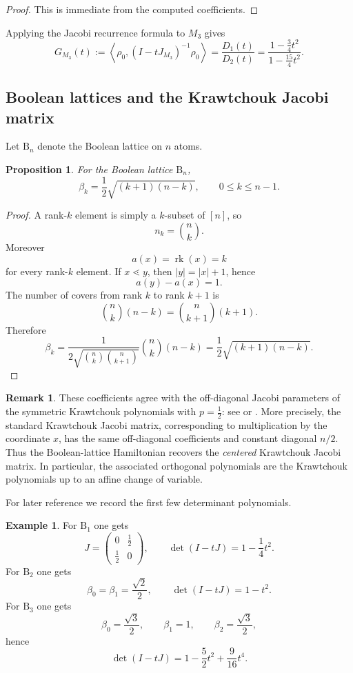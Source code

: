 \documentclass[11pt]{amsart}
\newtheorem{prop}[thm]{Proposition}
\theoremstyle{definition}
\newtheorem{remark}[thm]{Remark}
\newtheorem{example}[thm]{Example}
\DeclareMathOperator{\rk}{rk}
\newcommand{\ip}[2]{\left\langle #1, #2 \right\rangle}
\newcommand{\BB}{\mathrm{B}}
\begin{document}
\begin{proof}
This is immediate from the computed coefficients.
\end{proof}


Applying the Jacobi recurrence formula to $M_3$ gives
\[
G_{M_3}(t):=\ip{\rho_0}{(I-tJ_{M_3})^{-1}\rho_0}
=\frac{D_1(t)}{D_2(t)}
=
\frac{1-\frac34 t^2}{1-\frac{15}{4}t^2}.
\]



\subsection{Boolean lattices and the Krawtchouk Jacobi matrix}

Let $\BB_n$ denote the Boolean lattice on $n$ atoms.

\begin{prop}\label{prop:boolean-beta}
For the Boolean lattice $\BB_n$,
\[
\beta_k=\frac12 \sqrt{(k+1)(n-k)},
\qquad 0\le k\le n-1.
\]
\end{prop}

\begin{proof}
A rank-$k$ element is simply a $k$-subset of $[n]$, so
\[
n_k=\binom{n}{k}.
\]
Moreover
\[
a(x)=\rk(x)=k
\]
for every rank-$k$ element.  If $x\lessdot y$, then $|y|=|x|+1$, hence
\[
a(y)-a(x)=1.
\]
The number of covers from rank $k$ to rank $k+1$ is
\[
\binom{n}{k}(n-k)=\binom{n}{k+1}(k+1).
\]
Therefore
\[
\beta_k=
\frac{1}{2\sqrt{\binom{n}{k}\binom{n}{k+1}}}\binom{n}{k}(n-k)
=\frac12\sqrt{(k+1)(n-k)}.
\]
\end{proof}


\begin{remark}
These coefficients agree with the off-diagonal Jacobi parameters of the symmetric Krawtchouk polynomials with $p=\frac{1}{2}$: see \cite{Chihara} or \cite[Chapter 9]{Koekoek}. More precisely, the standard Krawtchouk Jacobi matrix, corresponding to multiplication by the coordinate $x$, has the same off-diagonal coefficients and constant diagonal $n/2$. Thus the Boolean-lattice Hamiltonian recovers the \emph{centered} Krawtchouk Jacobi matrix. In particular, the associated orthogonal polynomials are the Krawtchouk polynomials up to an affine change of variable.
\end{remark}

For later reference we record the first few determinant polynomials.

\begin{example}
For $\BB_1$ one gets
\[
J=
\begin{pmatrix}
0 & \frac12\\
\frac12 & 0
\end{pmatrix},
\qquad
\det(I-tJ)=1-\frac14 t^2.
\]
For $\BB_2$ one gets
\[
\beta_0=\beta_1=\frac{\sqrt{2}}{2},
\qquad
\det(I-tJ)=1-t^2.
\]
For $\BB_3$ one gets
\[
\beta_0=\frac{\sqrt{3}}{2},\qquad \beta_1=1,\qquad \beta_2=\frac{\sqrt{3}}{2},
\]
hence
\[
\det(I-tJ)=1-\frac52 t^2+\frac{9}{16}t^4.
\]
\end{example}
\end{document}
